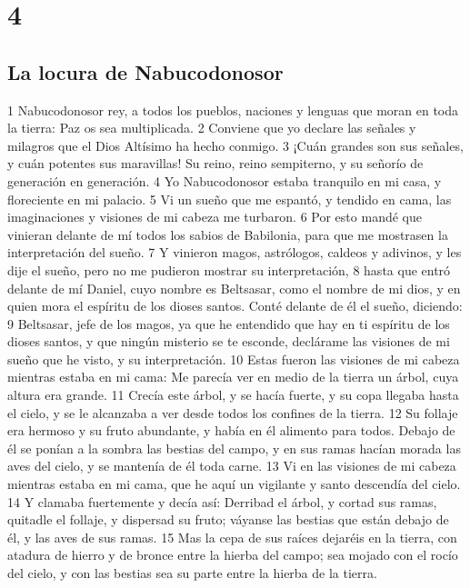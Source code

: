 \chapter{4}

\section*{La locura de Nabucodonosor}

1 Nabucodonosor rey, a todos los pueblos, naciones y lenguas que moran en toda la tierra: Paz os sea multiplicada.
2 Conviene que yo declare las señales y milagros que el Dios Altísimo ha hecho conmigo.
3 ¡Cuán grandes son sus señales, y cuán potentes sus maravillas! Su reino, reino sempiterno, y su señorío de generación en generación.
4 Yo Nabucodonosor estaba tranquilo en mi casa, y floreciente en mi palacio.
5 Vi un sueño que me espantó, y tendido en cama, las imaginaciones y visiones de mi cabeza me turbaron.
6 Por esto mandé que vinieran delante de mí todos los sabios de Babilonia, para que me mostrasen la interpretación del sueño.
7 Y vinieron magos, astrólogos, caldeos y adivinos, y les dije el sueño, pero no me pudieron mostrar su interpretación,
8 hasta que entró delante de mí Daniel, cuyo nombre es Beltsasar, como el nombre de mi dios, y en quien mora el espíritu de los dioses santos. Conté delante de él el sueño, diciendo:
9 Beltsasar, jefe de los magos, ya que he entendido que hay en ti espíritu de los dioses santos, y que ningún misterio se te esconde, declárame las visiones de mi sueño que he visto, y su interpretación.
10 Estas fueron las visiones de mi cabeza mientras estaba en mi cama: Me parecía ver en medio de la tierra un árbol, cuya altura era grande.
11 Crecía este árbol, y se hacía fuerte, y su copa llegaba hasta el cielo, y se le alcanzaba a ver desde todos los confines de la tierra.
12 Su follaje era hermoso y su fruto abundante, y había en él alimento para todos. Debajo de él se ponían a la sombra las bestias del campo, y en sus ramas hacían morada las aves del cielo, y se mantenía de él toda carne.
13 Vi en las visiones de mi cabeza mientras estaba en mi cama, que he aquí un vigilante y santo descendía del cielo.
14 Y clamaba fuertemente y decía así: Derribad el árbol, y cortad sus ramas, quitadle el follaje, y dispersad su fruto; váyanse las bestias que están debajo de él, y las aves de sus ramas.
15 Mas la cepa de sus raíces dejaréis en la tierra, con atadura de hierro y de bronce entre la hierba del campo; sea mojado con el rocío del cielo, y con las bestias sea su parte entre la hierba de la tierra.
